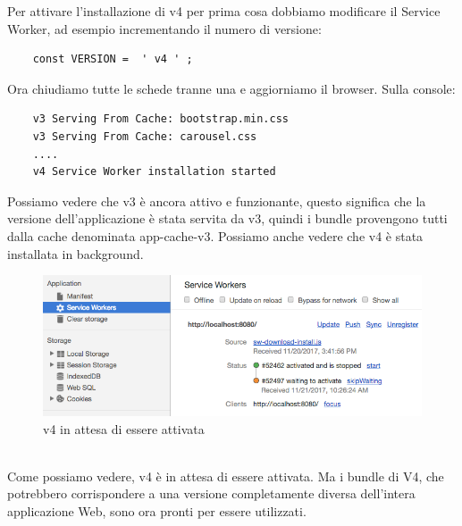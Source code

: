 \documentclass[italian]{article}
\begin{document}
Per attivare l'installazione di v4 per prima cosa dobbiamo modificare il Service Worker, ad esempio incrementando il numero di versione:

\begin{lstlisting}
	const VERSION =  ' v4 ' ;
\end{lstlisting}
Ora chiudiamo tutte le schede tranne una e aggiorniamo il browser. Sulla console:
\begin{lstlisting}
	v3 Serving From Cache: bootstrap.min.css
	v3 Serving From Cache: carousel.css
	....
	v4 Service Worker installation started 
\end{lstlisting}
Possiamo vedere che v3 è ancora attivo e funzionante, questo significa che la versione dell'applicazione è stata servita da v3, quindi i bundle provengono tutti dalla cache denominata app-cache-v3.
Possiamo anche vedere che v4 è stata installata in background.
\begin{figure}[h]
	\centering
	\includegraphics[width=1\linewidth]{v41}
	\caption{v4 in attesa di essere attivata}
	\label{fig:v4 in attesa di essere attivata}
\end{figure}\\
Come possiamo vedere, v4 è in attesa di essere attivata. Ma i bundle di V4, che potrebbero corrispondere a una versione completamente diversa dell'intera applicazione Web, sono ora pronti per essere utilizzati.
\end{document}

